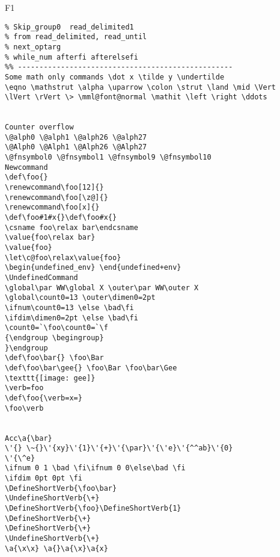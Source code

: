 \documentclass{article}
\begin{document}
\begin{filecontents+}{F1}
\begin{Verbatim}
% Skip_group0  read_delimited1 
% from read_delimited, read_until
% next_optarg 
% while_num afterfi afterelsefi
%% --------------------------------------------------
Some math only commands \dot x \tilde y \undertilde
\eqno \mathstrut \alpha \uparrow \colon \strut \land \mid \Vert
\lVert \rVert \> \mml@font@normal \mathit \left \right \ddots


Counter overflow
\@alph0 \@alph1 \@alph26 \@alph27
\@Alph0 \@Alph1 \@Alph26 \@Alph27
\@fnsymbol0 \@fnsymbol1 \@fnsymbol9 \@fnsymbol10
Newcommand
\def\foo{}
\renewcommand\foo[12]{}
\renewcommand\foo[\z@]{}
\renewcommand\foo[x]{}
\def\foo#1#x{}\def\foo#x{}
\csname foo\relax bar\endcsname 
\value{foo\relax bar}
\value{foo}
\let\c@foo\relax\value{foo}
\begin{undefined_env} \end{undefined+env}
\UndefinedCommand
\global\par WW\global X \outer\par WW\outer X 
\global\count0=13 \outer\dimen0=2pt 
\ifnum\count0=13 \else \bad\fi
\ifdim\dimen0=2pt \else \bad\fi
\count0=`\foo\count0=`\f
{\endgroup \begingroup}
}\endgroup
\def\foo\bar{} \foo\Bar
\def\foo\bar\gee{} \foo\Bar \foo\bar\Gee 
\texttt{[image: gee]}
\verb=foo
\def\foo{\verb=x=}
\foo\verb


Acc\a{\bar}
\'{} \~{}\'{xy}\'{1}\'{+}\'{\par}\'{\'e}\'{^^ab}\'{0}
\'{\^e}
\ifnum 0 1 \bad \fi\ifnum 0 0\else\bad \fi
\ifdim 0pt 0pt \fi
\DefineShortVerb{\foo\bar}
\UndefineShortVerb{\+}
\DefineShortVerb{\foo}\DefineShortVerb{1}
\DefineShortVerb{\+}
\DefineShortVerb{\+}
\UndefineShortVerb{\+}
\a{\x\x} \a{}\a{\x}\a{x}


\end{Verbatim}
\end{filecontents+}
\end{document}
